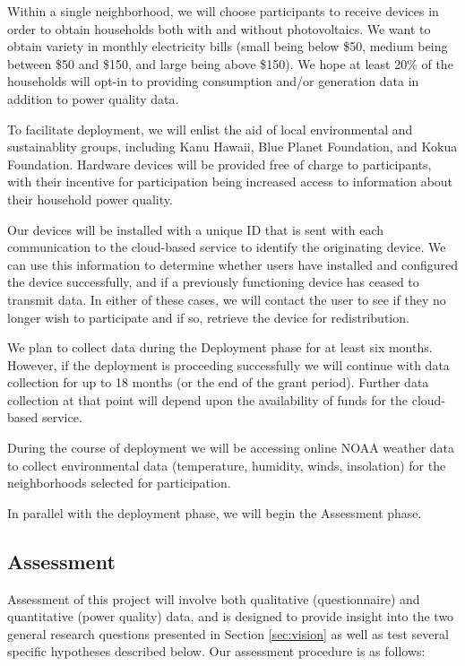 Within a single neighborhood, we will choose participants to receive devices in order to obtain households both with and without photovoltaics. We want to obtain variety in monthly electricity bills (small being below \$50, medium being between \$50 and \$150, and large being above \$150).  We hope at least 20\% of the households will opt-in to providing consumption and/or generation data in addition to power quality data. 

To facilitate deployment, we will enlist the aid of local environmental and sustainablity groups, including Kanu Hawaii, Blue Planet Foundation, and Kokua Foundation.  Hardware devices will be provided free of charge to participants, with their incentive for participation being increased access to information about their household power quality.  

Our devices will be installed with a unique ID that is sent with each communication to the cloud-based service to identify the originating device.  We can use this information to determine whether users have installed and configured the device successfully, and if a previously functioning device has ceased to transmit data.   In either of these cases, we will contact the user to see if they no longer wish to participate and if so, retrieve the device for redistribution. 

We plan to collect data during the Deployment phase for at least six months. However, if the deployment is proceeding successfully we will continue with data collection for up to 18 months (or the end of the grant period).  Further data collection at that point will depend upon the availability of funds for the cloud-based service.

During the course of deployment we will be accessing online NOAA weather data to collect environmental data (temperature, humidity, winds, insolation) for the neighborhoods selected for participation. 

In parallel with the deployment phase, we will begin the Assessment phase. 

\subsection{Assessment}

Assessment of this project will involve both qualitative (questionnaire) and quantitative (power quality) data, and is designed to provide insight into the two general research questions presented in Section \ref{sec:vision} as well as test several specific hypotheses described below. Our assessment procedure is as follows:

